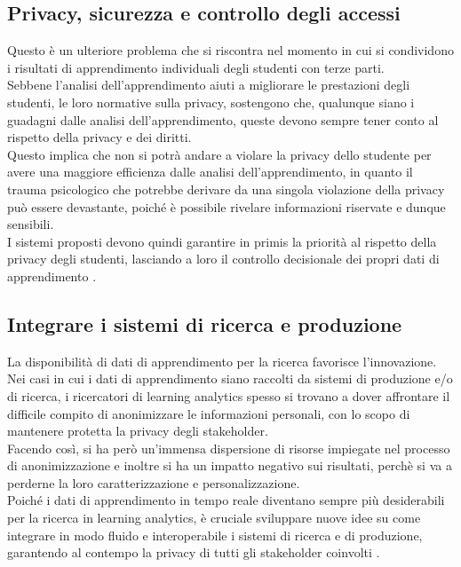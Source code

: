 \subsection{Privacy, sicurezza e controllo degli accessi}
Questo è un ulteriore problema che si riscontra nel momento in cui si condividono i risultati di apprendimento individuali degli studenti con terze parti. 
\\Sebbene l'analisi dell'apprendimento aiuti a migliorare le prestazioni degli studenti, le loro normative sulla privacy, sostengono che, qualunque siano i guadagni dalle analisi dell'apprendimento, queste devono sempre tener conto al rispetto della privacy e dei diritti.
\\Questo implica che non si potrà andare a violare la privacy dello studente per avere una maggiore efficienza dalle analisi dell'apprendimento,
in quanto il trauma psicologico che potrebbe derivare da una singola violazione della privacy può essere devastante, poiché è possibile rivelare informazioni riservate e dunque sensibili. 
\\I sistemi proposti devono quindi garantire in primis la priorità al rispetto della privacy degli studenti, lasciando a loro il controllo decisionale dei propri dati di apprendimento \cite{ocheja2018connecting}.

\subsection{Integrare i sistemi di ricerca e produzione}
La disponibilità di dati di apprendimento per la ricerca favorisce l'innovazione. 
Nei casi in cui i dati di apprendimento siano raccolti da sistemi di produzione e/o di ricerca, i ricercatori di learning analytics spesso si trovano a dover affrontare il difficile compito di anonimizzare le informazioni personali, con lo scopo di mantenere protetta la privacy degli stakeholder.
\\Facendo così, si ha però un'immensa dispersione di risorse impiegate nel processo di anonimizzazione e inoltre si ha un impatto negativo sui risultati, perchè si va a perderne la loro caratterizzazione e personalizzazione. 
\\Poiché i dati di apprendimento in tempo reale diventano sempre più desiderabili per la ricerca in learning analytics, è cruciale sviluppare nuove idee su come integrare in modo fluido e interoperabile i sistemi di ricerca e di produzione, garantendo al contempo la privacy di tutti gli stakeholder coinvolti \cite{ocheja2018connecting}.

